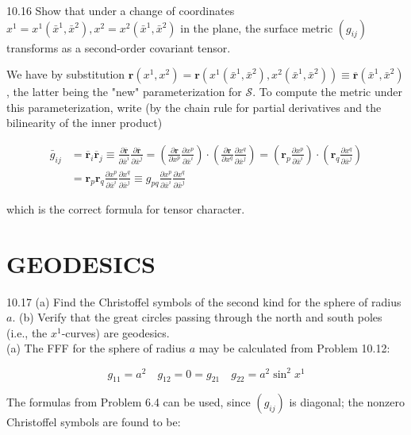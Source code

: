 \documentclass[10pt]{article}
\begin{document}
10.16 Show that under a change of coordinates $x^{1}=x^{1}\left(\bar{x}^{1}, \bar{x}^{2}\right), x^{2}=x^{2}\left(\bar{x}^{1}, \bar{x}^{2}\right)$ in the plane, the surface metric $\left(g_{i j}\right)$ transforms as a second-order covariant tensor.

We have by substitution $\mathbf{r}\left(x^{1}, x^{2}\right)=\mathbf{r}\left(x^{1}\left(\bar{x}^{1}, \bar{x}^{2}\right), x^{2}\left(\bar{x}^{1}, \bar{x}^{2}\right)\right) \equiv \overline{\mathbf{r}}\left(\bar{x}^{1}, \bar{x}^{2}\right)$, the latter being the "new" parameterization for $\mathscr{S}$. To compute the metric under this parameterization, write (by the chain rule for partial derivatives and the bilinearity of the inner product)

$$
\begin{aligned}
\bar{g}_{i j} & =\overline{\mathbf{r}}_{i} \overline{\mathbf{r}}_{j} \equiv \frac{\partial \overline{\mathbf{r}}}{\partial \bar{x}^{i}} \frac{\partial \overline{\mathbf{r}}}{\partial \bar{x}^{j}}=\left(\frac{\partial \mathbf{r}}{\partial x^{p}} \frac{\partial x^{p}}{\partial \bar{x}^{i}}\right) \cdot\left(\frac{\partial \mathbf{r}}{\partial x^{q}} \frac{\partial x^{q}}{\partial \bar{x}^{j}}\right)=\left(\mathbf{r}_{p} \frac{\partial x^{p}}{\partial \bar{x}^{i}}\right) \cdot\left(\mathbf{r}_{q} \frac{\partial x^{q}}{\partial \bar{x}^{j}}\right) \\
& =\mathbf{r}_{p} \mathbf{r}_{q} \frac{\partial x^{p}}{\partial \bar{x}^{i}} \frac{\partial x^{q}}{\partial \bar{x}^{j}} \equiv g_{p q} \frac{\partial x^{p}}{\partial \bar{x}^{i}} \frac{\partial x^{q}}{\partial \bar{x}^{j}}
\end{aligned}
$$

which is the correct formula for tensor character.

\section*{GEODESICS}
10.17 (a) Find the Christoffel symbols of the second kind for the sphere of radius $a$. (b) Verify that the great circles passing through the north and south poles (i.e., the $x^{1}$-curves) are geodesics.\\
(a) The FFF for the sphere of radius $a$ may be calculated from Problem 10.12:

$$
g_{11}=a^{2} \quad g_{12}=0=g_{21} \quad g_{22}=a^{2} \sin ^{2} x^{1}
$$

The formulas from Problem 6.4 can be used, since $\left(g_{i j}\right)$ is diagonal; the nonzero Christoffel symbols are found to be:
\end{document}
